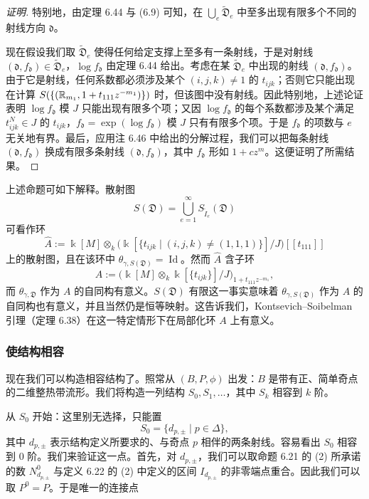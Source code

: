 \begin{proof}[证明]
特别地，由定理 6.44 与 (6.9) 可知，在 $\bigcup_e\tilde{\mathfrak{D}}_e$ 中至多出现有限多个不同的射线方向 $\mathfrak{d}$。

现在假设我们取 $\tilde{\mathfrak{D}}_e$ 使得任何给定支撑上至多有一条射线，于是对射线 $(\mathfrak{d},f_{\mathfrak{d}})\in\tilde{\mathfrak{D}}_e$，$\log f_{\mathfrak{d}}$ 由定理 6.44 给出。考虑在某 $\tilde{\mathfrak{D}}_e$ 中出现的射线 $(\mathfrak{d},f_{\mathfrak{d}})$。由于它是射线，任何系数都必须涉及某个 $(i,j,k)\ne1$ 的 $t_{ijk}$；否则它只能出现在计算 $S(\{(\mathbb{R}_{m_1},1+t_{111}z^{-m_1})\})$ 时，但该图中没有射线。因此特别地，上述论证表明 $\log f_{\mathfrak{d}}$ 模 $J$ 只能出现有限多个项；又因 $\log f_{\mathfrak{d}}$ 的每个系数都涉及某个满足 $t_{ijk}^N\in J$ 的 $t_{ijk}$，$f_{\mathfrak{d}}=\exp(\log f_{\mathfrak{d}})$ 模 $J$ 只有有限多个项。于是 $f_{\mathfrak{d}}$ 的项数与 $e$ 无关地有界。最后，应用注 6.46 中给出的分解过程，我们可以把每条射线 $(\mathfrak{d},f_{\mathfrak{d}})$ 换成有限多条射线 $(\mathfrak{d},f_{\mathfrak{d}})$，其中 $f_{\mathfrak{d}}$ 形如 $1+cz^m$。这便证明了所需结果。
\end{proof}

\begin{remark}
上述命题可如下解释。散射图
\[
S(\mathfrak{D})=\bigcup_{e=1}^\infty S_{\tilde I_e}(\mathfrak{D})
\]
可看作环
\[
\hat A:= \Bbbk[M]\otimes_ k\big( \Bbbk[\{t_{ijk}\mid(i,j,k)\ne(1,1,1)\}]/J\big)[\![t_{111}]\!]
\]
上的散射图，且在该环中 $\theta_{\gamma,S(\mathfrak{D})}=\operatorname{Id}$。然而 $\hat A$ 含子环
\[
A:=\big( \Bbbk[M]\otimes_ k \Bbbk[\{t_{ijk}\}]/J\big)_{1+t_{111}z^{-m_1}},
\]
而 $\theta_{\gamma,\mathfrak{D}}$ 作为 $A$ 的自同构有意义。$S(\mathfrak{D})$ 有限这一事实意味着 $\theta_{\gamma,S(\mathfrak{D})}$ 作为 $A$ 的自同构也有意义，并且当然仍是恒等映射。这告诉我们，Kontsevich–Soibelman 引理（定理 6.38）在这一特定情形下在局部化环 $A$ 上有意义。
\end{remark}

\subsubsection{使结构相容}

现在我们可以构造相容结构了。照常从 $(B,P,\phi)$ 出发：$B$ 是带有正、简单奇点的二维整热带流形。我们将构造一列结构 $S_0,S_1,\dots$，其中 $S_k$ 相容到 $k$ 阶。

从 $S_0$ 开始：这里别无选择，只能置
\[
S_0=\{d_{p,\pm}\mid p\in\Delta\},
\]
其中 $d_{p,\pm}$ 表示结构定义所要求的、与奇点 $p$ 相伴的两条射线。容易看出 $S_0$ 相容到 $0$ 阶。我们来验证这一点。首先，对 $d_{p,\pm}$，我们可以取命题 6.21 的 (2) 所承诺的数 $N_{d_{p,\pm}}^0$ 与定义 6.22 的 (2) 中定义的区间 $I_{d_{p,\pm}}$ 的非零端点重合。因此我们可以取 $P^0=P$。于是唯一的连接点

